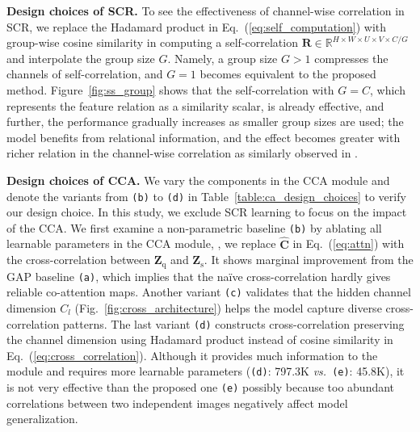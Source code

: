 \documentclass[10pt,twocolumn,letterpaper]{article}
\newcommand{\Real}{\mathbb{R}}
\newcommand{\bC}{\mathbf{C}}
\newcommand{\bZ}{\mathbf{Z}}
\newcommand{\bR}{\mathbf{R}}
\newcommand{\texts}{{\text{s}}}
\newcommand{\textq}{{\text{q}}}
\newcommand{\abbself}{SCR\xspace}
\newcommand{\abbcross}{CCA\xspace}
\newcommand{\smallbreakparagraph}[1]{\smallbreak \noindent \textbf{#1}}
\begin{document}
\smallbreakparagraph{Design choices of \abbself.} 
To see the effectiveness of channel-wise correlation in \abbself, we replace the Hadamard product in Eq.~(\ref{eq:self_computation}) with group-wise cosine similarity in computing a self-correlation $\bR \in \Real^{H \times W \times U \times V \times C / G}$ and interpolate the group size $G$.
Namely, a group size $G>1$ compresses the channels of self-correlation, and $G=1$ becomes equivalent to the proposed method.
Figure~\ref{fig:ss_group} shows that the self-correlation with $G=C$, which represents the feature relation as a similarity scalar, is already effective, and further, the performance gradually increases as smaller group sizes are used; 
the model benefits from relational information, and the effect becomes greater with richer relation in the channel-wise correlation as similarly observed in \cite{zhao2020exploring}. 







\smallbreakparagraph{Design choices of \abbcross.} 
We vary the components in the \abbcross module and denote the variants from \texttt{(b)} to \texttt{(d)} in Table~\ref{table:ca_design_choices} to verify our design choice.
In this study, we exclude \abbself learning to focus on the impact of the \abbcross.
We first examine a non-parametric baseline \texttt{(b)} by ablating all learnable parameters in the \abbcross module, \ie, we replace $\hat{\bC}$ in Eq.~(\ref{eq:attn}) with the cross-correlation between $\bZ_\textq$ and $\bZ_\texts$.
It shows marginal improvement from the GAP baseline \texttt{(a)}, which implies that the na\"ive cross-correlation hardly gives reliable co-attention maps.
Another variant \texttt{(c)} validates that the hidden channel dimension $C_l$ (Fig.~\ref{fig:cross_architecture}) helps the model capture diverse cross-correlation patterns.
The last variant \texttt{(d)} constructs cross-correlation preserving the channel dimension using Hadamard product instead of cosine similarity in Eq.~(\ref{eq:cross_correlation}).
Although it provides much information to the module and requires more learnable parameters (\texttt{(d)}: 797.3K {\em vs.}\  \texttt{(e)}: 45.8K), it is not very effective than the proposed one \texttt{(e)} possibly because too abundant correlations between two independent images negatively affect model generalization.
\end{document}
